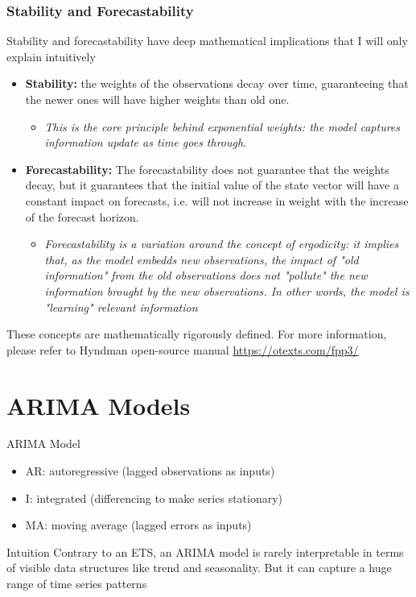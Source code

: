 \documentclass{beamer}
\newenvironment{wideitemize}{\itemize\addtolength{\itemsep}{10pt}}{\enditemize}
\begin{document}
\begin{frame}
  \frametitle{Stability and Forecastability}
  \begin{wideitemize}
  \item Stability and forecastability have deep mathematical implications that I will only explain intuitively
    \begin{itemize}
    \item \textbf{Stability:} the weights of the observations decay over time, guaranteeing that the newer ones will have higher weights than old one.
      \begin{itemize}
      \item \emph{This is the core principle behind exponential weights: the model captures information update as time goes through}. 
      \end{itemize}      
    \item \textbf{Forecastability:} The forecastability does not guarantee that the weights decay, but it guarantees that the initial value of the state vector will have a constant impact on forecasts, i.e. will not increase in weight with the increase of the forecast horizon.
      \begin{itemize}
      \item \emph{Forecastability is a variation around the concept of ergodicity: it implies that, as the model embedds new observations, the impact of "old information" from the old observations does not "pollute" the new information brought by the new observations. In other words, the model is "learning" relevant information }
      \end{itemize}
    \end{itemize}
    \item These concepts are mathematically rigorously defined. For more information, please refer to Hyndman open-source manual \url{https://otexts.com/fpp3/}
  \end{wideitemize}
\end{frame}


\section{ARIMA Models}


\begin{frame}{ARIMA Model}

  \begin{itemize}
  \item AR: autoregressive (lagged observations as inputs)
  \item I: integrated (differencing to make series stationary)
  \item MA: moving average (lagged errors as inputs)
  \end{itemize}

  \begin{block}{Intuition}
    Contrary to an ETS, an ARIMA model is rarely interpretable in terms of visible data structures like trend and seasonality. But it can capture a huge range of time series patterns
  \end{block}  
\end{frame}
\end{document}
